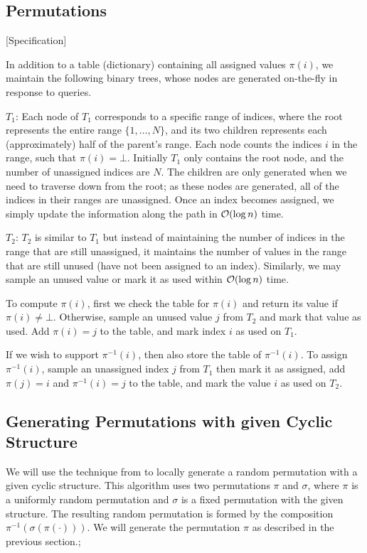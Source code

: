 \subsection{Permutations}

[Specification]

In addition to a table (dictionary) containing all assigned values $\pi(i)$, we maintain the following binary trees,
whose nodes are generated on-the-fly in response to queries.

$T_1$: Each node of $T_1$ corresponds to a specific range of indices,
where the root represents the entire range $\{1, \ldots, N\}$,
and its two children represents each (approximately) half of the parent's range.
Each node counts the indices $i$ in the range, such that $\pi(i) = \bot$.
Initially $T_1$ only contains the root node, and the number of unassigned indices are $N$.
The children are only generated when we need to traverse down from the root; as these nodes are generated,
all of the indices in their ranges are unassigned.
Once an index becomes assigned, we simply update the information along the path in $\Bo(\log n)$ time.

$T_2$: $T_2$ is similar to $T_1$ but instead of maintaining the number of indices in the range that are still unassigned,
it maintains the number of values in the range that are still unused (have not been assigned to an index).
Similarly, we may sample an unused value or mark it as used within $\Bo(\log n)$ time.

To compute $\pi(i)$, first we check the table for $\pi(i)$ and return its value if $\pi(i)\neq\bot$.
Otherwise, sample an unused value $j$ from $T_2$ and mark that value as used.
Add $\pi(i) = j$ to the table, and mark index $i$ as used on $T_1$.

If we wish to support $\pi^{-1}(i)$, then also store the table of $\pi^{-1}(i)$.
To assign $\pi^{-1}(i)$, sample an unassigned index $j$ from $T_1$ then mark it as assigned,
add $\pi(j)=i$ and $\pi^{-1}(i)=j$ to the table, and mark the value $i$ as used on $T_2$.

\subsection{Generating Permutations with given Cyclic Structure}
We will use the technique from \cite{cyclic} to locally generate a random permutation with a given cyclic structure.
This algorithm uses two permutations $\pi$ and $\sigma$,
where $\pi$ is a uniformly random permutation and $\sigma$ is a fixed permutation with the given structure.
The resulting random permutation is formed by the composition $\pi^{-1}(\sigma(\pi(\cdot)))$.
We will generate the permutation $\pi$ as described in the previous section.;



